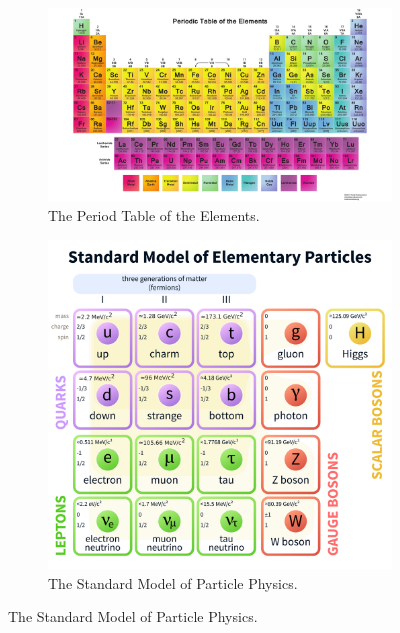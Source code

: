 \begin{figure}[hbp!]
\centering
\begin{subfigure}[c]{0.55\textwidth}
\includegraphics[width=\textwidth]{figs/PeriodicTable.pdf}
\caption{The Period Table of the Elements.}
\end{subfigure}
\begin{subfigure}[c]{0.4\textwidth}
\includegraphics[width=\textwidth]{figs/StandardModelofElementaryParticles.pdf}
\caption{The Standard Model of Particle Physics.}
\label{fig:sm}
\end{subfigure}
\end{figure}

